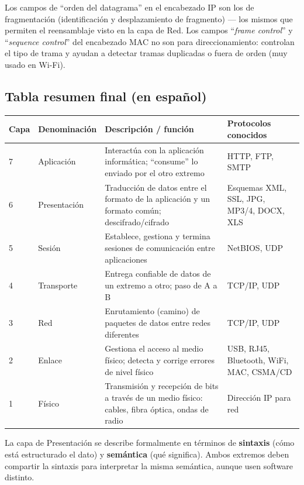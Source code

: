 \documentclass[11pt,a4paper]{article}
\begin{document}
Los campos de ``orden del datagrama'' en el encabezado IP son los de fragmentación (identificación y desplazamiento de fragmento) --- los mismos que permiten el reensamblaje visto en la capa de Red. Los campos ``\textit{frame control}'' y ``\textit{sequence control}'' del encabezado MAC no son para direccionamiento: controlan el tipo de trama y ayudan a detectar tramas duplicadas o fuera de orden (muy usado en Wi-Fi).

\subsection*{Tabla resumen final (en español)}
\begin{center}
\small
\begin{tabularx}{\textwidth}{@{}l l X X@{}}
\toprule
\textbf{Capa} & \textbf{Denominación} & \textbf{Descripción / función} & \textbf{Protocolos conocidos} \\
\midrule
7 & Aplicación & Interactúa con la aplicación informática; ``consume'' lo enviado por el otro extremo & HTTP, FTP, SMTP \\
6 & Presentación & Traducción de datos entre el formato de la aplicación y un formato común; descifrado/cifrado & Esquemas XML, SSL, JPG, MP3/4, DOCX, XLS \\
5 & Sesión & Establece, gestiona y termina sesiones de comunicación entre aplicaciones & NetBIOS, UDP \\
4 & Transporte & Entrega confiable de datos de un extremo a otro; paso de A a B & TCP/IP, UDP \\
3 & Red & Enrutamiento (camino) de paquetes de datos entre redes diferentes & TCP/IP, UDP \\
2 & Enlace & Gestiona el acceso al medio físico; detecta y corrige errores de nivel físico & USB, RJ45, Bluetooth, WiFi, MAC, CSMA/CD \\
1 & Físico & Transmisión y recepción de bits a través de un medio físico: cables, fibra óptica, ondas de radio & Dirección IP para red \\
\bottomrule
\end{tabularx}
\end{center}

\begin{examfact}
La capa de Presentación se describe formalmente en términos de \textbf{sintaxis} (cómo está estructurado el dato) y \textbf{semántica} (qué significa). Ambos extremos deben compartir la sintaxis para interpretar la misma semántica, aunque usen software distinto.
\end{examfact}
\end{document}
